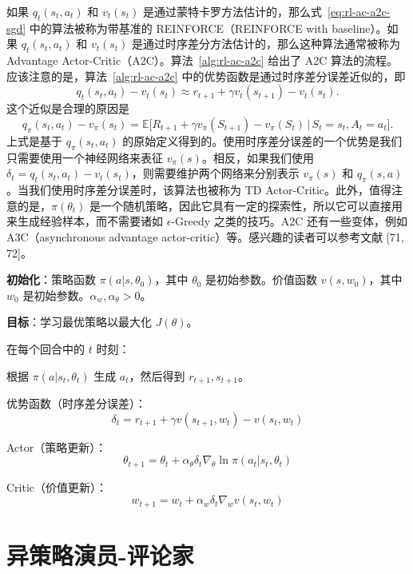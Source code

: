如果 $q_{t}(s_{t}, a_{t})$ 和 $v_{t}(s_{t})$ 是通过蒙特卡罗方法估计的，那么式~\eqref{eq:rl-ac-a2c-sgd} 中的算法被称为带基准的 REINFORCE（REINFORCE with baseline）。如果 $q_{t}(s_{t}, a_{t})$ 和 $v_{t}(s_{t})$ 是通过时序差分方法估计的，那么这种算法通常被称为 Advantage Actor-Critic（A2C）。算法~\ref{alg:rl-ac-a2c} 给出了 A2C 算法的流程。应该注意的是，算法~\ref{alg:rl-ac-a2c} 中的优势函数是通过时序差分误差近似的，即
\[
q_{t}(s_{t}, a_{t}) - v_{t}(s_{t}) \approx r_{t+1} + \gamma v_{t}(s_{t+1}) - v_{t}(s_{t}).
\]
这个近似是合理的原因是
\[
q_{\pi}(s_{t}, a_{t}) - v_{\pi}(s_{t}) = \mathbb{E} \Big[ R_{t+1} + \gamma v_{\pi}(S_{t+1}) - v_{\pi}(S_{t}) \,\big|\, S_{t} = s_{t}, A_{t} = a_{t} \Big].
\]
上式是基于 $q_{\pi}(s_{t}, a_{t})$ 的原始定义得到的。使用时序差分误差的一个优势是我们只需要使用一个神经网络来表征 $v_{\pi}(s)$。相反，如果我们使用 $\delta_{t} = q_{t}(s_{t}, a_{t}) - v_{t}(s_{t})$，则需要维护两个网络来分别表示 $v_{\pi}(s)$ 和 $q_{\pi}(s, a)$。当我们使用时序差分误差时，该算法也被称为 TD Actor-Critic。此外，值得注意的是，$\pi(\theta_{t})$ 是一个随机策略，因此它具有一定的探索性，所以它可以直接用来生成经验样本，而不需要诸如 $\epsilon$-Greedy 之类的技巧。A2C 还有一些变体，例如 A3C（asynchronous advantage actor-critic）等。感兴趣的读者可以参考文献 [71, 72]。

\begin{algo}\label{alg:rl-ac-a2c}
\textbf{初始化}：策略函数 $\pi(a | s, \theta_{0})$，其中 $\theta_{0}$ 是初始参数。价值函数 $v(s, w_{0})$，其中 $w_{0}$ 是初始参数。$\alpha_{w}, \alpha_{\theta} > 0$。

\textbf{目标}：学习最优策略以最大化 $J(\theta)$。

在每个回合中的 $t$ 时刻：

\quad 根据 $\pi(a | s_{t}, \theta_{t})$ 生成 $a_{t}$，然后得到 $r_{t+1}, s_{t+1}$。

\quad 优势函数（时序差分误差）：
\[
\delta_{t} = r_{t+1} + \gamma v(s_{t+1}, w_{t}) - v(s_{t}, w_{t})
\]

\quad Actor（策略更新）：
\[
\theta_{t+1} = \theta_{t} + \alpha_{\theta} \delta_{t} \nabla_{\theta} \ln \pi(a_{t} | s_{t}, \theta_{t})
\]

\quad Critic（价值更新）：
\[
w_{t+1} = w_{t} + \alpha_{w} \delta_{t} \nabla_{w} v(s_{t}, w_{t})
\]
\end{algo}

\section{异策略演员-评论家}
\label{sec:rl-ac-offpolicy}

